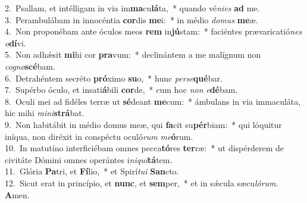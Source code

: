 {2.~}Psallam, et intélligam in via im\textbf{ma}cu\textbf{lá}ta,~* quando vé\textit{ni}\textit{es} \textbf{ad} me.\\
{3.~}Perambulábam in innocéntia \textbf{cor}dis \textbf{me}i:~* in médio \textit{do}\textit{mus} \textbf{me}æ.\\
{4.~}Non proponébam ante óculos meos \textbf{rem} in\textbf{jú}stam:~* faciéntes prævaricatió\textit{nes} \textit{o}\textbf{dí}vi.\\
{5.~}Non adhǽsit \textbf{mi}hi cor \textbf{pra}vum:~* declinántem a me malígnum non \textit{co}\textit{gno}\textbf{scé}bam.\\
{6.~}Detrahéntem secréto \textbf{pró}ximo \textbf{su}o,~* hunc \textit{per}\textit{se}\textbf{qué}bar.\\
{7.~}Supérbo óculo, et insati\textbf{á}bili \textbf{cor}de,~* cum hoc \textit{non} \textit{e}\textbf{dé}bam.\\
{8.~}Oculi mei ad fidéles terræ ut \textbf{sé}deant \textbf{me}cum:~* ámbulans in via immaculáta, hic mihi \textit{mi}\textit{ni}\textbf{strá}bat.\\
{9.~}Non habitábit in médio domus meæ, qui \textbf{fa}cit su\textbf{pér}biam:~* qui lóquitur iníqua, non diréxit in conspéctu oculó\textit{rum} \textit{me}\textbf{ó}rum.\\
{10.~}In matutíno interficiébam omnes pecca\textbf{tó}res \textbf{ter}ræ:~* ut dispérderem de civitáte Dómini omnes operántes i\textit{ni}\textit{qui}\textbf{tá}tem.\\
{11.~}Glória \textbf{Pa}tri, et \textbf{Fí}lio,~* et Spirí\textit{tu}\textit{i} \textbf{San}cto.\\
{12.~}Sicut erat in princípio, et \textbf{nunc}, et \textbf{sem}per,~* et in sǽcula sæcu\textit{ló}\textit{rum}. \textbf{A}men.\\

